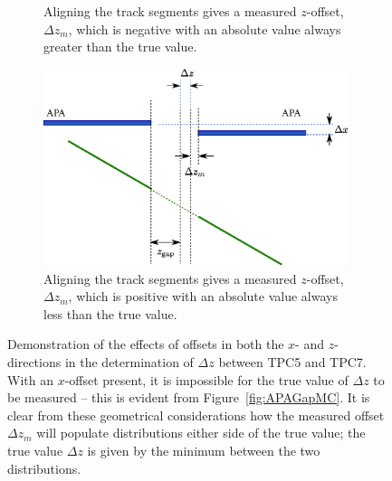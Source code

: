 \begin{figure}
\begin{subfigure}[t]{0.48\linewidth}
    \caption{Aligning the track segments gives a measured $z$-offset, $\Delta z_m$, which is negative with an absolute value always greater than the true value.}
    \label{fig:APAGapXOffsetZOffsetPosFix}
  \end{subfigure}
  \hfill
  \begin{subfigure}[t]{0.48\linewidth}
    \centering
    \includegraphics[width=0.98\textwidth]{apa_gap_xoffset_zoffset_neg_fix.eps}
    \caption{Aligning the track segments gives a measured $z$-offset, $\Delta z_m$, which is positive with an absolute value always less than the true value.}
    \label{fig:APAGapXOffsetZOffsetNegFix}
  \end{subfigure}
  \caption{Demonstration of the effects of offsets in both the $x$- and $z$-directions in the determination of $\Delta z$ between TPC5 and TPC7.  With an $x$-offset present, it is impossible for the true value of $\Delta z$ to be measured -- this is evident from Figure~\ref{fig:APAGapMC}.  It is clear from these geometrical considerations how the measured offset $\Delta z_m$ will populate distributions either side of the true value; the true value $\Delta z$ is given by the minimum between the two distributions.}
  \label{fig:APAGapXOffsetZOffset}
\end{figure}

